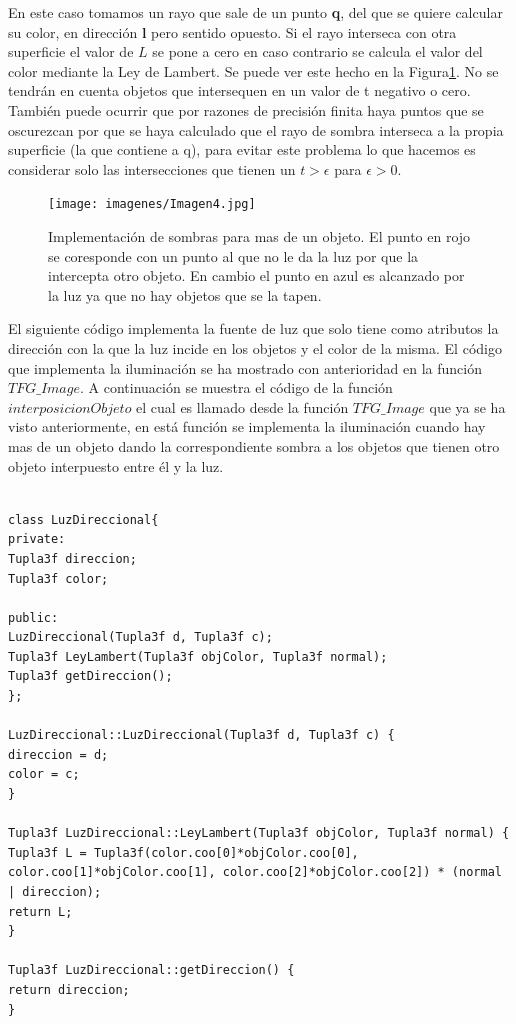 En este caso tomamos un rayo que sale de un punto \textbf{q}, del que se quiere calcular su color, en dirección \textbf{l} pero sentido opuesto. Si el rayo interseca con otra superficie el valor de $L$ se pone a cero en caso contrario se calcula el valor del color mediante la Ley de Lambert. Se puede ver este hecho en la Figura\ref{fig:etiq_6}. No se tendrán en cuenta objetos que intersequen en un valor de t negativo o cero.
	${ }$\\	
	
También puede ocurrir que por razones de precisión finita haya puntos que se oscurezcan por que se haya calculado que el rayo de sombra interseca a la propia superficie (la que contiene a q), para evitar este problema lo que hacemos es considerar solo las intersecciones que tienen un $t > \epsilon$ para $\epsilon > 0 $.
	${ }$\\	

\begin{figure}
	\begin{center}
		\texttt{[image: imagenes/Imagen4.jpg]}
	\end{center}
	\caption{Implementación de sombras para mas de un objeto. El punto en rojo se coresponde con un punto al que no le da la luz por que la intercepta otro objeto. En cambio el punto en azul es alcanzado por la luz ya que no hay objetos que se la tapen.}
	\label{fig:etiq_6}
\end{figure}

El siguiente código implementa la fuente de luz que solo tiene como atributos la dirección con la que la luz incide en los objetos y el color de la misma. El código que implementa la iluminación se ha mostrado con anterioridad en la función $TFG\_Image$. A continuación se muestra el código de la función $interposicionObjeto$ el cual es llamado desde la función $TFG\_Image$ que ya se ha visto anteriormente, en está función se implementa la iluminación cuando hay mas de un objeto dando la correspondiente sombra a los objetos que tienen otro objeto interpuesto entre él y la luz.





\begin{lstlisting}[style=Consola]

class LuzDireccional{
private:
Tupla3f direccion;
Tupla3f color;

public:
LuzDireccional(Tupla3f d, Tupla3f c);
Tupla3f LeyLambert(Tupla3f objColor, Tupla3f normal);
Tupla3f getDireccion();
};

LuzDireccional::LuzDireccional(Tupla3f d, Tupla3f c) {
direccion = d;
color = c;
}

Tupla3f LuzDireccional::LeyLambert(Tupla3f objColor, Tupla3f normal) {
Tupla3f L = Tupla3f(color.coo[0]*objColor.coo[0], color.coo[1]*objColor.coo[1], color.coo[2]*objColor.coo[2]) * (normal | direccion);
return L;
}

Tupla3f LuzDireccional::getDireccion() {
return direccion;
}


\end{lstlisting}


